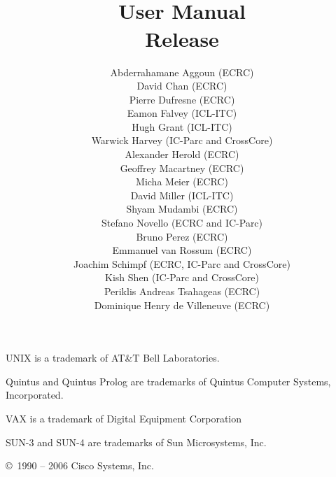 \documentclass[11pt,a4paper]{book}
\title{
    {\Large\bf {\eclipse}}\\
    \vspace{1cm}
    {\Huge\bf User Manual}\\
    \vspace{1cm}
    Release \eclipseversion}
\author{
Abderrahamane Aggoun (ECRC) \\
David Chan (ECRC) \\
Pierre Dufresne (ECRC) \\
Eamon Falvey (ICL-ITC) \\
Hugh Grant (ICL-ITC) \\
Warwick Harvey (IC-Parc and CrossCore) \\
Alexander Herold (ECRC) \\
Geoffrey Macartney (ECRC) \\
Micha Meier (ECRC) \\
David Miller (ICL-ITC) \\
Shyam Mudambi (ECRC) \\
Stefano Novello (ECRC and IC-Parc) \\
Bruno Perez (ECRC) \\
Emmanuel van Rossum (ECRC) \\
Joachim Schimpf (ECRC, IC-Parc and CrossCore) \\
Kish Shen (IC-Parc and CrossCore)\\
Periklis Andreas Tsahageas (ECRC) \\
Dominique Henry de Villeneuve (ECRC) \\
}
\begin{document}
\nocite{sepex,eventh,environ,compnd,arch}


\maketitle


\setcounter{page}{2}
\pagestyle{empty}

\vfill
{}

\bigskip\bigskip
UNIX is a trademark of AT\&T Bell Laboratories.

Quintus and Quintus Prolog are trademarks of
Quintus Computer Systems, Incorporated.

VAX is a trademark of Digital Equipment Corporation

SUN-3 and SUN-4 are trademarks of Sun Microsystems, Inc.

\bigskip\bigskip\bigskip\bigskip\bigskip\bigskip

\copyright\ 1990 -- 2006 Cisco Systems, Inc.

\bigskip\bigskip\bigskip\bigskip\bigskip\bigskip

\cleardoublepage
\pagestyle{plain}

\tableofcontents

\cleardoublepage
{}







%

















\appendix




%



\newpage
\printindex

\newpage


\end{document}
